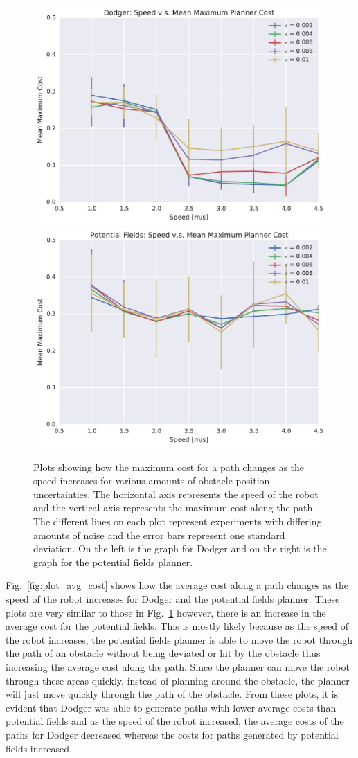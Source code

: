 \documentclass[letterpaper, 10pt, conference]{ieeeconf}
\begin{document}
\begin{figure}[h!]
    \centering
    \includegraphics[width=0.48\linewidth]{figs/planner_mean_max_cost_0}
    \includegraphics[width=0.48\linewidth]{figs/pf_mean_max_cost_0}

    \caption{Plots showing how the maximum cost for a path changes as the
        speed increases for various amounts of obstacle position uncertainties.
        The horizontal axis represents the speed of the robot and the vertical
        axis represents the maximum cost along the path. The different lines on
    each plot represent experiments with differing amounts of noise and the
error bars represent one standard deviation.  On the left is the graph for
Dodger and on the right is the graph for the potential fields planner.}

    \label{fig:plot_max_cost}
\end{figure}

Fig.~\ref{fig:plot_avg_cost} shows how the average cost along a path changes as
the speed of the robot increases for Dodger and the potential fields planner.
These plots are very similar to those in Fig.~\ref{fig:plot_max_cost} however,
there is an increase in the average cost for the potential fields. This is
mostly likely because as the speed of the robot increases, the potential fields
planner is able to move the robot through the path of an obstacle without being
deviated or hit by the obstacle thus increasing the average cost along the
path. Since the planner can move the robot through these areas quickly, instead
of planning around the obstacle, the planner will just move quickly through the
path of the obstacle. From these plots, it is evident that Dodger was able to
generate paths with lower average costs than potential fields and as the speed
of the robot increased, the average costs of the paths for Dodger decreased
whereas the costs for paths generated by potential fields increased.
\end{document}

